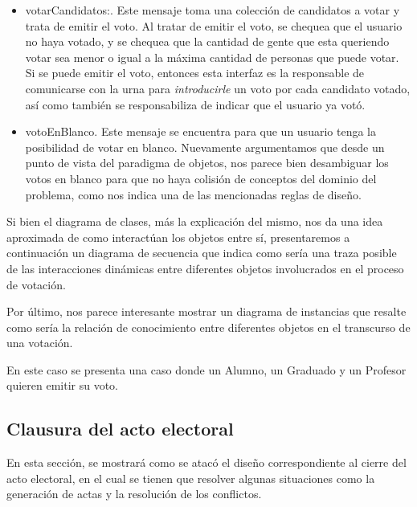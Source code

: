 \begin{itemize}
\item votarCandidatos:. Este mensaje toma una colecci\'on de candidatos a votar y trata de emitir el voto. Al tratar de emitir el voto, se chequea que el usuario no haya votado, y se chequea que la cantidad de gente que esta queriendo votar sea menor o igual a la m\'axima cantidad de personas que puede votar. Si se puede emitir el voto, entonces esta interfaz es la responsable de comunicarse con la urna para \emph{introducirle} un voto por cada candidato votado, as\'i como tambi\'en se responsabiliza de indicar que el usuario ya vot\'o.
\item votoEnBlanco. Este mensaje se encuentra para que un usuario tenga la posibilidad de votar en blanco. Nuevamente argumentamos que desde un punto de vista del paradigma de objetos, nos parece bien desambiguar los votos en blanco para que no haya colisi\'on de conceptos del dominio del problema, como nos indica una de las mencionadas reglas de dise\~{n}o.
\end{itemize}




\bigskip

Si bien el diagrama de clases, m\'as la explicaci\'on del mismo, nos da una idea aproximada de como interact\'uan los objetos entre s\'i, presentaremos a continuaci\'on un diagrama de secuencia que indica como ser\'ia una traza posible de las interacciones din\'amicas entre diferentes objetos involucrados en el proceso de votaci\'on.


\bigskip

Por \'ultimo, nos parece interesante mostrar un diagrama de instancias que resalte como ser\'ia la relaci\'on de conocimiento entre diferentes objetos en el transcurso de una votaci\'on.

En este caso se presenta una caso donde un Alumno, un Graduado y un Profesor quieren emitir su voto.




\subsection{Clausura del acto electoral}

En esta secci\'on, se mostrar\'a como se atac\'o el diseño correspondiente al cierre del acto electoral, en el cual se tienen que resolver algunas situaciones como la generaci\'on de actas y la resoluci\'on de los conflictos.

